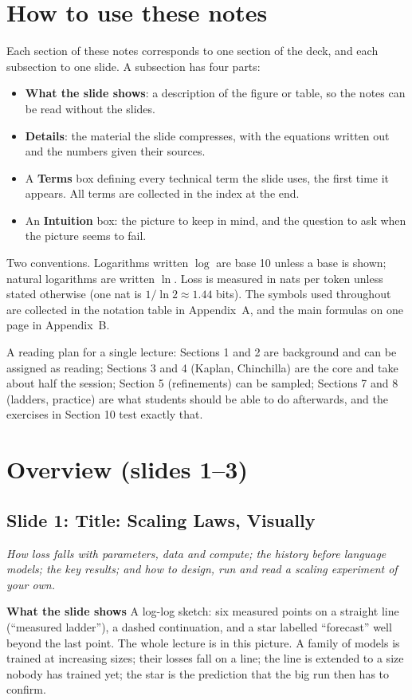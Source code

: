 \documentclass[11pt,letterpaper]{article}
\newcommand{\setstage}[1]{\colorlet{stagec}{#1}}
\newcommand{\slide}[3]{%
  \subsection[Slide #1: #2]{Slide #1: #2}%
  {\color{muted}\itshape #3\par}\medskip}
\newcommand{\para}[1]{\medskip\noindent\textbf{#1}\quad}
\begin{document}
\section*{How to use these notes}
Each section of these notes corresponds to one section of the deck, and each subsection to one slide. A subsection has four parts:
\begin{itemize}
  \item \textbf{What the slide shows}: a description of the figure or table, so the notes can be read without the slides.
  \item \textbf{Details}: the material the slide compresses, with the equations written out and the numbers given their sources.
  \item A \textbf{Terms} box defining every technical term the slide uses, the first time it appears. All terms are collected in the index at the end.
  \item An \textbf{Intuition} box: the picture to keep in mind, and the question to ask when the picture seems to fail.
\end{itemize}
Two conventions. Logarithms written $\log$ are base 10 unless a base is shown; natural logarithms are written $\ln$. Loss is measured in nats per token unless stated otherwise (one nat is $1/\ln 2\approx1.44$ bits). The symbols used throughout are collected in the notation table in Appendix~A, and the main formulas on one page in Appendix~B.

A reading plan for a single lecture: Sections 1 and 2 are background and can be assigned as reading; Sections 3 and 4 (Kaplan, Chinchilla) are the core and take about half the session; Section 5 (refinements) can be sampled; Sections 7 and 8 (ladders, practice) are what students should be able to do afterwards, and the exercises in Section 10 test exactly that.

\setstage{ink}
\section{Overview (slides 1--3)}

\slide{1}{Title: Scaling Laws, Visually}{How loss falls with parameters, data and compute; the history before language models; the key results; and how to design, run and read a scaling experiment of your own.}

\para{What the slide shows} A log-log sketch: six measured points on a straight line (``measured ladder''), a dashed continuation, and a star labelled ``forecast'' well beyond the last point. The whole lecture is in this picture. A family of models is trained at increasing sizes; their losses fall on a line; the line is extended to a size nobody has trained yet; the star is the prediction that the big run then has to confirm.
\end{document}
